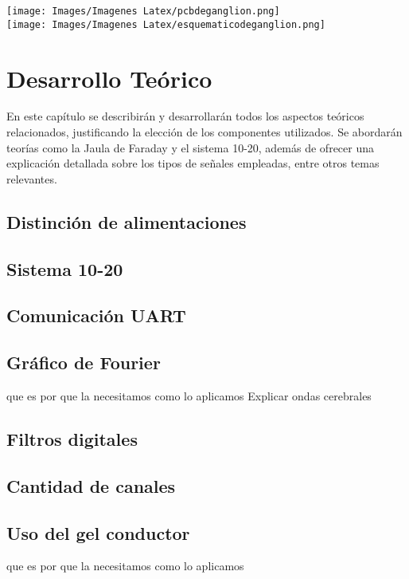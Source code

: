 \documentclass{article}
\begin{document}
\begin{center}
    \texttt{[image: Images/Imagenes Latex/pcbdeganglion.png]}\\

    \texttt{[image: Images/Imagenes Latex/esquematicodeganglion.png]}\\
\end {center}

\section{Desarrollo Teórico}
En este capítulo se describirán y desarrollarán todos los aspectos teóricos relacionados, justificando la elección de los componentes utilizados. Se abordarán teorías como la Jaula de Faraday y el sistema 10-20, además de ofrecer una explicación detallada sobre los tipos de señales empleadas, entre otros temas relevantes.

\subsection{Distinción de alimentaciones}

\subsection{Sistema 10-20}

\subsection{Comunicación UART}

\subsection{Gráfico de Fourier}
que es
por que la necesitamos
como lo aplicamos
Explicar ondas cerebrales

\subsection{Filtros digitales}

\subsection{Cantidad de canales}

\subsection{Uso del gel conductor}
que es
por que la necesitamos
como lo aplicamos
\end{document}
